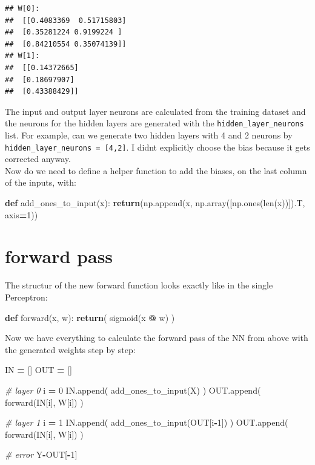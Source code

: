 \documentclass[
]{book}
\newenvironment{Shaded}{\begin{snugshade}}{\end{snugshade}}
\newcommand{\BuiltInTok}[1]{#1}
\newcommand{\CommentTok}[1]{\textcolor[rgb]{0.56,0.35,0.01}{\textit{#1}}}
\newcommand{\ControlFlowTok}[1]{\textcolor[rgb]{0.13,0.29,0.53}{\textbf{#1}}}
\newcommand{\DecValTok}[1]{\textcolor[rgb]{0.00,0.00,0.81}{#1}}
\newcommand{\KeywordTok}[1]{\textcolor[rgb]{0.13,0.29,0.53}{\textbf{#1}}}
\newcommand{\NormalTok}[1]{#1}
\newcommand{\OperatorTok}[1]{\textcolor[rgb]{0.81,0.36,0.00}{\textbf{#1}}}
\begin{document}
\begin{verbatim}
## W[0]: 
##  [[0.4083369  0.51715803]
##  [0.35281224 0.9199224 ]
##  [0.84210554 0.35074139]]
## W[1]: 
##  [[0.14372665]
##  [0.18697907]
##  [0.43388429]]
\end{verbatim}

The input and output layer neurons are calculated from the training dataset and the neurons for the hidden layers are generated with the \texttt{hidden\_layer\_neurons} list. For example, can we generate two hidden layers with 4 and 2 neurons by \texttt{hidden\_layer\_neurons\ =\ {[}4,2{]}}. I didnt explicitly choose the bias because it gets corrected anyway.\\
Now do we need to define a helper function to add the biases, on the last column of the inputs, with:

\begin{Shaded}
\begin{Highlighting}[]
\KeywordTok{def}\NormalTok{ add\_ones\_to\_input(x):}
  \ControlFlowTok{return}\NormalTok{(np.append(x, np.array([np.ones(}\BuiltInTok{len}\NormalTok{(x))]).T, axis}\OperatorTok{=}\DecValTok{1}\NormalTok{))}
\end{Highlighting}
\end{Shaded}

\hypertarget{forward-pass-1}{%
\section{forward pass}\label{forward-pass-1}}

The structur of the new forward function looks exactly like in the single Perceptron:

\begin{Shaded}
\begin{Highlighting}[]
\KeywordTok{def}\NormalTok{ forward(x, w):}
  \ControlFlowTok{return}\NormalTok{( sigmoid(x }\OperatorTok{@}\NormalTok{ w) )}
\end{Highlighting}
\end{Shaded}

Now we have everything to calculate the forward pass of the NN from above with the generated weights step by step:

\begin{Shaded}
\begin{Highlighting}[]
\NormalTok{IN }\OperatorTok{=}\NormalTok{ []}
\NormalTok{OUT }\OperatorTok{=}\NormalTok{ []}

\CommentTok{\# layer 0}
\NormalTok{i }\OperatorTok{=} \DecValTok{0}
\NormalTok{IN.append( add\_ones\_to\_input(X) )}
\NormalTok{OUT.append( forward(IN[i], W[i]) )}

\CommentTok{\# layer 1}
\NormalTok{i }\OperatorTok{=} \DecValTok{1}
\NormalTok{IN.append( add\_ones\_to\_input(OUT[i}\OperatorTok{{-}}\DecValTok{1}\NormalTok{]) )}
\NormalTok{OUT.append( forward(IN[i], W[i]) )}

\CommentTok{\# error}
\NormalTok{Y}\OperatorTok{{-}}\NormalTok{OUT[}\OperatorTok{{-}}\DecValTok{1}\NormalTok{]}
\end{Highlighting}
\end{Shaded}
\end{document}
